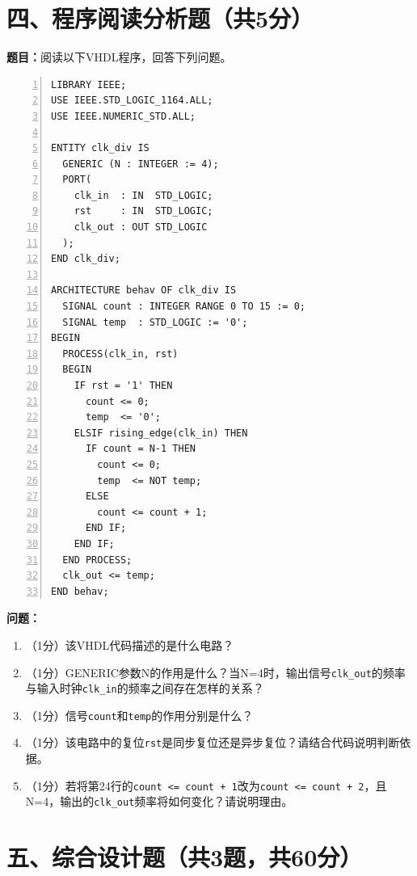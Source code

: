 \newpage

\section*{四、程序阅读分析题（共5分）}

\textbf{题目：}阅读以下VHDL程序，回答下列问题。

\vspace{0.3cm}

\begin{lstlisting}[caption={待分析VHDL程序——分频器}, language=VDL, numbers=left]
LIBRARY IEEE;
USE IEEE.STD_LOGIC_1164.ALL;
USE IEEE.NUMERIC_STD.ALL;

ENTITY clk_div IS
  GENERIC (N : INTEGER := 4);
  PORT(
    clk_in  : IN  STD_LOGIC;
    rst     : IN  STD_LOGIC;
    clk_out : OUT STD_LOGIC
  );
END clk_div;

ARCHITECTURE behav OF clk_div IS
  SIGNAL count : INTEGER RANGE 0 TO 15 := 0;
  SIGNAL temp  : STD_LOGIC := '0';
BEGIN
  PROCESS(clk_in, rst)
  BEGIN
    IF rst = '1' THEN
      count <= 0;
      temp  <= '0';
    ELSIF rising_edge(clk_in) THEN
      IF count = N-1 THEN
        count <= 0;
        temp  <= NOT temp;
      ELSE
        count <= count + 1;
      END IF;
    END IF;
  END PROCESS;
  clk_out <= temp;
END behav;
\end{lstlisting}

\vspace{0.3cm}

\textbf{问题：}
\begin{enumerate}[label=(\arabic*)]
  \item （1分）该VHDL代码描述的是什么电路？
  \item （1分）GENERIC参数N的作用是什么？当N=4时，输出信号\texttt{clk\_out}的频率与输入时钟\texttt{clk\_in}的频率之间存在怎样的关系？
  \item （1分）信号\texttt{count}和\texttt{temp}的作用分别是什么？
  \item （1分）该电路中的复位\texttt{rst}是同步复位还是异步复位？请结合代码说明判断依据。
  \item （1分）若将第24行的\texttt{count <= count + 1}改为\texttt{count <= count + 2}，且N=4，输出的\texttt{clk\_out}频率将如何变化？请说明理由。
\end{enumerate}

\newpage

\section*{五、综合设计题（共3题，共60分）}

